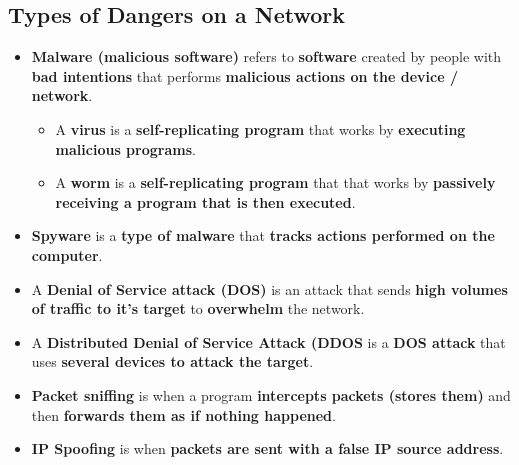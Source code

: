 \documentclass[16pt]{article}
\begin{document}
    \subsection*{Types of Dangers on a Network}
    \begin{itemize}
        \item \textbf{Malware (malicious software)} refers to \textbf{software} created by people with \textbf{bad intentions} that performs \textbf{malicious actions on the device / network}.
        \begin{itemize}
            \item A \textbf{virus} is a \textbf{self-replicating program} that works by \textbf{executing malicious programs}.
            \item A \textbf{worm} is a \textbf{self-replicating program} that that works by \textbf{passively receiving a program that is then executed}.
        \end{itemize}
        \item \textbf{Spyware} is a \textbf{type of malware} that \textbf{tracks actions performed on the computer}.
        \item A \textbf{Denial of Service attack (DOS)} is an attack that sends \textbf{high volumes of traffic to it's target} to \textbf{overwhelm} the network.
        \item A \textbf{Distributed Denial of Service Attack (DDOS} is a \textbf{DOS attack} that uses \textbf{several devices to attack the target}.
        \item \textbf{Packet sniffing} is when a program \textbf{intercepts packets (stores them)} and then \textbf{forwards them as if nothing happened}.
        \item \textbf{IP Spoofing} is when \textbf{packets are sent with a false IP source address}.
    \end{itemize}
\end{document}
